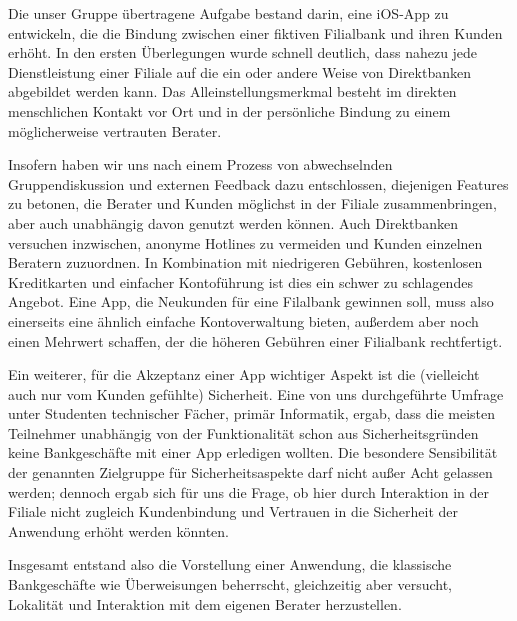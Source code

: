 	Die unser Gruppe übertragene Aufgabe bestand darin, eine iOS-App zu entwickeln, die die Bindung zwischen einer fiktiven Filialbank und ihren Kunden erhöht. In den ersten Ü\-ber\-le\-gung\-en wurde schnell deutlich, dass nahezu jede Dienstleistung einer Filiale auf die ein oder andere Weise von Direktbanken abgebildet werden kann. Das Alleinstellungsmerkmal besteht im direkten menschlichen Kontakt vor Ort und in der persönliche Bindung zu einem möglicherweise vertrauten Berater. 
    
Insofern haben wir uns nach einem Prozess von abwechselnden Gruppendiskussion und externen Feedback dazu entschlossen, diejenigen Features zu betonen, die Berater und Kunden möglichst in der Filiale zusammenbringen, aber auch unabhängig davon genutzt werden können. Auch Direktbanken versuchen inzwischen, anonyme Hotlines zu vermeiden und Kunden einzelnen Beratern zuzuordnen. In Kombination mit niedrigeren Gebühren, kostenlosen Kreditkarten und einfacher Kontoführung ist dies ein schwer zu schlagendes Angebot. Eine App, die Neukunden für eine Filalbank gewinnen soll, muss also einerseits eine ähnlich einfache Kontoverwaltung bieten, außerdem aber noch einen Mehrwert schaffen, der die höheren Gebühren einer Filialbank rechtfertigt.

Ein weiterer, für die Akzeptanz einer App wichtiger Aspekt ist die (vielleicht auch nur vom Kunden gefühlte) Sicherheit. Eine von uns durchgeführte Umfrage unter Studenten technischer Fächer, primär Informatik, ergab, dass die meisten Teilnehmer unabhängig von der Funktionalität schon aus Sicherheitsgründen keine Bankgeschäfte mit einer App erledigen wollten. Die besondere Sensibilität der genannten Zielgruppe für Sicherheitsaspekte darf nicht außer Acht gelassen werden; dennoch ergab sich für uns die Frage, ob hier durch Interaktion in der Filiale nicht zugleich Kundenbindung und Vertrauen in die Sicherheit der Anwendung erhöht werden könnten. 

Insgesamt entstand also die Vorstellung einer Anwendung, die klassische Bankgeschäfte wie Überweisungen beherrscht, gleichzeitig aber versucht, Lokalität und Interaktion mit dem eigenen Berater herzustellen. 